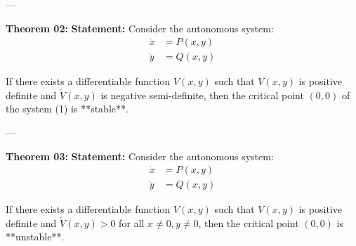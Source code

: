 ---

\textbf{Theorem 02:}
\textbf{Statement:}
Consider the autonomous system:
\begin{align}
    \dot{x} &= P(x, y) \nonumber \\
    \dot{y} &= Q(x, y)
\end{align}

If there exists a differentiable function $V(x, y)$ such that $V(x, y)$ is positive definite and $\dot{V}(x, y)$ is negative semi-definite, then the critical point $(0,0)$ of the system (1) is **stable**.

---

\textbf{Theorem 03:}
\textbf{Statement:}
Consider the autonomous system:
\begin{align}
    \dot{x} &= P(x, y) \nonumber \\
    \dot{y} &= Q(x, y)
\end{align}

If there exists a differentiable function $V(x, y)$ such that $V(x, y)$ is positive definite and $\dot{V}(x, y) > 0$ for all $x \neq 0, y \neq 0$, then the critical point $(0,0)$ is **unstable**.
